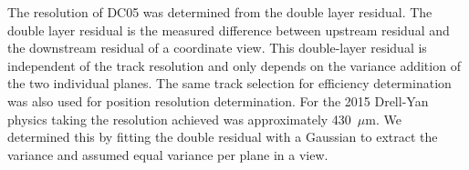 The resolution of DC05 was determined from the double layer residual.
The double layer residual is the measured difference between upstream
residual and the downstream residual of a coordinate view.  This
double-layer residual is independent of the track resolution and only
depends on the variance addition of the two individual planes.  The
same track selection for efficiency determination was also used for
position resolution determination.  For the 2015 Drell-Yan physics
taking the resolution achieved was approximately 430~$\mu$m.  We determined
this by fitting the double residual with a Gaussian to extract the
variance and assumed equal variance per plane in a view.
